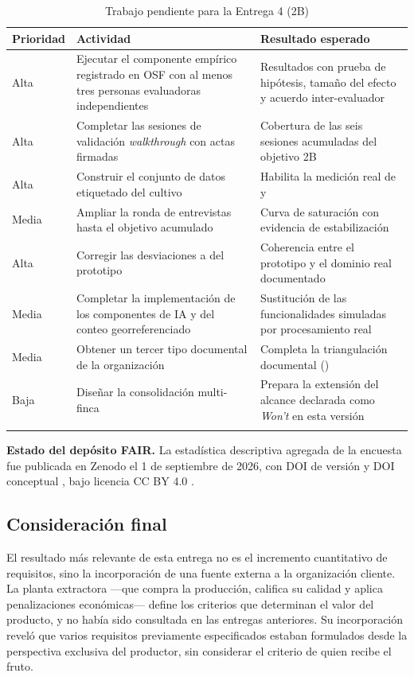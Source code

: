 \begin{longtable}{|C{1.4cm}|L{7.0cm}|L{6.6cm}|}
\hline
{}\textbf{Prioridad} & \textbf{Actividad} & \textbf{Resultado esperado} \\
\hline
\endhead
Alta & Ejecutar el componente empírico registrado en OSF con al menos tres personas evaluadoras independientes & Resultados con prueba de hipótesis, tamaño del efecto y acuerdo inter-evaluador \\ \hline
Alta & Completar las sesiones de validación \emph{walkthrough} con actas firmadas & Cobertura de las seis sesiones acumuladas del objetivo 2B \\ \hline
Alta & Construir el conjunto de datos etiquetado del cultivo & Habilita la medición real de  y  \\ \hline
Media & Ampliar la ronda de entrevistas hasta el objetivo acumulado & Curva de saturación con evidencia de estabilización \\ \hline
Alta & Corregir las desviaciones  a  del prototipo & Coherencia entre el prototipo y el dominio real documentado \\ \hline
Media & Completar la implementación de los componentes de IA y del conteo georreferenciado & Sustitución de las funcionalidades simuladas por procesamiento real \\ \hline
Media & Obtener un tercer tipo documental de la organización & Completa la triangulación documental () \\ \hline
Baja & Diseñar la consolidación multi-finca & Prepara la extensión del alcance declarada como \emph{Won't} en esta versión \\ \hline
\caption{Trabajo pendiente para la Entrega 4 (2B)}
\end{longtable}

\noindent\textbf{Estado del depósito FAIR.} La estadística descriptiva agregada de la encuesta fue publicada en Zenodo el 1 de septiembre de 2026, con DOI de versión  y DOI conceptual , bajo licencia CC BY 4.0 \cite{wilkinson2016}.

\subsection{Consideración final}

El resultado más relevante de esta entrega no es el incremento cuantitativo de requisitos, sino la
incorporación de una fuente externa a la organización cliente. La planta extractora ---que compra la
producción, califica su calidad y aplica penalizaciones económicas--- define los criterios que
determinan el valor del producto, y no había sido consultada en las entregas anteriores. Su
incorporación reveló que varios requisitos previamente especificados estaban formulados desde la
perspectiva exclusiva del productor, sin considerar el criterio de quien recibe el fruto.

